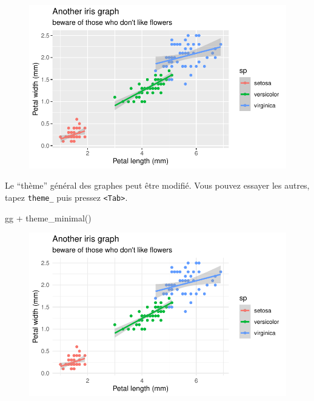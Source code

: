 \documentclass[
  letterpaper,
  DIV=11,
  numbers=noendperiod]{scrreprt}
\newenvironment{Shaded}{\begin{snugshade}}{\end{snugshade}}
\newcommand{\FunctionTok}[1]{\textcolor[rgb]{0.28,0.35,0.67}{#1}}
\newcommand{\NormalTok}[1]{\textcolor[rgb]{0.00,0.23,0.31}{#1}}
\newcommand{\SpecialCharTok}[1]{\textcolor[rgb]{0.37,0.37,0.37}{#1}}
\begin{document}
\begin{figure}[H]

{\centering \includegraphics{ggplot2_files/figure-pdf/unnamed-chunk-16-1.pdf}

}

\end{figure}

Le ``thème'' général des graphes peut être modifié. Vous pouvez essayer
les autres, tapez \texttt{theme\_} puis pressez
\texttt{\textless{}Tab\textgreater{}}.

\begin{Shaded}
\begin{Highlighting}[]
\NormalTok{gg }\SpecialCharTok{+} \FunctionTok{theme\_minimal}\NormalTok{()}
\end{Highlighting}
\end{Shaded}

\begin{figure}[H]

{\centering \includegraphics{ggplot2_files/figure-pdf/unnamed-chunk-17-1.pdf}

}

\end{figure}
\end{document}
